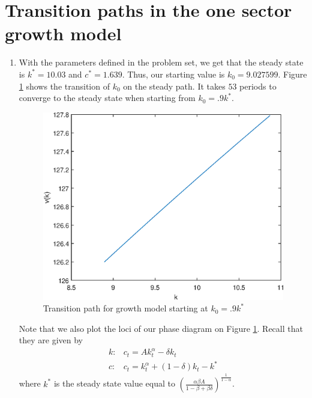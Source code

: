 \documentclass[12pt]{article}
\newcommand{\1}{{\bf 1}} %
\begin{document}
	
	\section*{Transition paths in the one sector growth model}
	
	\begin{enumerate}[(1)]
		\item 
		
		With the parameters defined in the problem set, we get that the steady state is $k^*=10.03 $ and $c^*=1.639$. Thus, our starting value is $k_0 = 9.027599$. Figure \ref{fig:fig1} shows the transition of $k_0$ on the steady path. It takes $53$ periods to converge to the steady state when starting from $k_0=.9k^*$.

		\begin{figure}[H]
	\centering
	\includegraphics[width=0.7\linewidth]{fig1}
	\caption{Transition path for growth model starting at $k_0=.9k^*$}
	\label{fig:fig1}
\end{figure}

Note that we also plot the loci of our phase diagram on Figure \ref{fig:fig1}. Recall that they are given by
\begin{align*}
	k:& c_t =Ak_t^\alpha - \delta k_t   \\
	c:& c_t = k_t^\alpha +(1-\delta)k_t-k^*
\end{align*}
where $k^*$ is the steady state value equal to $\left( \frac{\alpha\beta A}{1-\beta+\beta\delta}\right)^\frac{1}{1-\alpha}$.


\end{enumerate}
\end{document}

